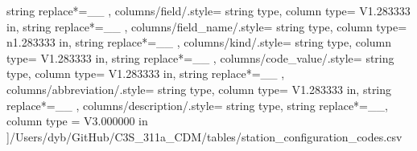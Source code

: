 \begin{landscape}
{            string replace*={_}{\_}
        },
    columns/field/.style={
            string type, 
            column type= V{1.283333 in}, 
            string replace*={_}{\_}
        },
    columns/field_name/.style={
            string type, 
            column type= n{1.283333 in}, 
            string replace*={_}{\_}
        },
    columns/kind/.style={
            string type, 
            column type= V{1.283333 in}, 
            string replace*={_}{\_}
        },
    columns/code_value/.style={
            string type, 
            column type= V{1.283333 in}, 
            string replace*={_}{\_}
        },
    columns/abbreviation/.style={
            string type, 
            column type= V{1.283333 in}, 
            string replace*={_}{\_}
        },
    columns/description/.style={
            string type, 
            string replace*={_}{\_},
            column type = V{3.000000 in}
        }
    ]{/Users/dyb/GitHub/C3S_311a_CDM/tables/station_configuration_codes.csv}
\end{landscape}
